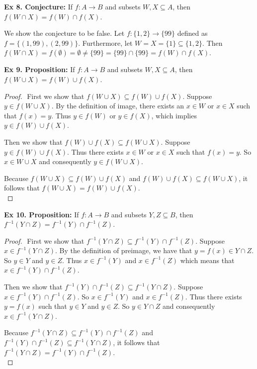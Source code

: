 \documentclass{article}
\begin{document}
\textbf{Ex 8. Conjecture:} If $f: A \rightarrow B$ and subsets $W,X \subseteq A$, then $f(W \cap X) = f(W)\cap f(X)$.

We show the conjecture to be false. Let $f : \{1,2\} \rightarrow \{99\}$ defined as $f=\{(1, 99), (2,99)\}$. Furthermore, let $W = X = \{1\} \subseteq \{1,2\}$. Then $f(W \cap X) = f(\emptyset) = \emptyset \neq \{99\} = \{99\} \cap \{99\} = f(W) \cap f(X)$.

\newpage

\textbf{Ex 9. Proposition:} If $f: A \rightarrow B$ and subsets $W, X \subseteq A$, then $f(W \cup X) = f(W) \cup f(X)$.
\begin{proof}
$ $\newline
First we show that $f(W \cup X) \subseteq f(W) \cup f(X)$. Suppose $y \in f(W \cup X)$. By the definition of image, there exists an $x \in W$ or $x \in X$ such that $f(x)=y$. Thus $y \in f(W)$ or $y \in f(X)$, which implies $y \in f(W) \cup f(X)$.

Then we show that $f(W) \cup f(X) \subseteq f(W \cup X)$. Suppose $y \in f(W) \cup f(X)$. Thus there exists $x \in W$ or $x \in X$ such that $f(x)=y$. So $x \in W \cup X$ and consequently $y \in f(W \cup X)$.

Because $f(W \cup X) \subseteq f(W) \cup f(X)$ and $f(W) \cup f(X) \subseteq f(W \cup X)$, it follows that $f(W \cup X) = f(W) \cup f(X)$.\\
\end{proof}

\textbf{Ex 10. Proposition:} If $f: A \rightarrow B$ and subsets $Y, Z \subseteq B$, then $f^{-1}(Y \cap Z)=f^{-1}(Y) \cap f^{-1}(Z)$.
\begin{proof}
$ $\newline
First we show that $f^{-1}(Y \cap Z) \subseteq f^{-1}(Y) \cap f^{-1}(Z)$. Suppose $x \in f^{-1}(Y \cap Z)$. By the definition of preimage, we have that $y = f(x) \in Y \cap Z$. So $y \in Y$ and $y \in Z$. Thus $x \in f^{-1}(Y)$ and $x \in f^{-1}(Z)$ which means that $x \in f^{-1}(Y) \cap f^{-1}(Z)$.

Then we show that $f^{-1}(Y) \cap f^{-1}(Z) \subseteq f^{-1}(Y \cap Z)$. Suppose $x \in f^{-1}(Y) \cap f^{-1}(Z)$. So $x \in f^{-1}(Y)$ and $x \in f^{-1}(Z)$. Thus there exists $y=f(x)$ such that $y \in Y$ and $y \in Z$. So $y \in Y \cap Z$ and consequently $x \in f^{-1}(Y \cap Z)$.

Because $f^{-1}(Y \cap Z) \subseteq f^{-1}(Y) \cap f^{-1}(Z)$ and $f^{-1}(Y) \cap f^{-1}(Z) \subseteq f^{-1}(Y \cap Z)$, it follows that $f^{-1}(Y \cap Z)=f^{-1}(Y) \cap f^{-1}(Z)$.\\
\end{proof}
\end{document}
